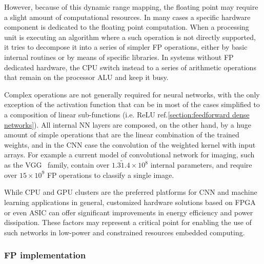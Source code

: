 
However, because of this dynamic range mapping, the floating point may require a slight amount of computational resources.
In many cases a specific hardware component is dedicated to the floating point computation. When a processing unit is executing an algorithm where a such operation is not directly supported, it tries to decompose it into a series of simpler \acs{FP} operations, either by basic internal routines or by means of specific libraries.
In systems without \acs{FP} dedicated hardware, the CPU switch instead to a series of arithmetic operations that remain on the processor \ac{ALU} and keep it busy.

Complex operations are not generally required for neural networks, with the only exception of the activation function that can be in most of the cases simplified to a composition of linear sub-functions (i.e. ReLU ref.\cref{section:feedforward dense networks}). All internal NN layers are composed, on the other hand, by a huge amount of simple operations that are the linear combination of the trained weights, and in the \acs{CNN} case the convolution of the weighted kernel with input arrays.
For example a current model of convolutional network for imaging, such as the VGG~\cite{Simonyan15} family, contain over
$1.3\tilde1.4\times10^8$ internal parameters, and require over $15\times10^9$ \acs{FP} operations to classify a single image.

While CPU and GPU clusters are the preferred platforms for \acs{CNN} and machine learning applications in general, customized hardware solutions based on \acs{FPGA} or even \acs{ASIC} can offer significant improvements in energy efficiency and power dissipation. 
These factors may represent a critical point for enabling the use of such networks in low-power and constrained resources embedded computing.

\subsubsection*{FP implementation}


